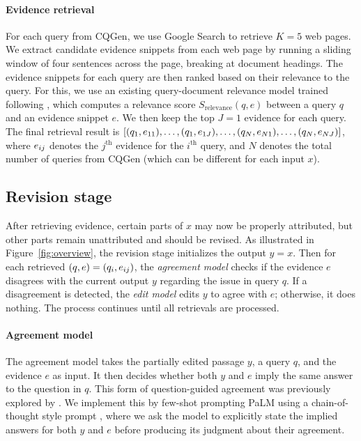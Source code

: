 \documentclass[11pt]{article}
\begin{document}
\paragraph{Evidence retrieval}
For each query from CQGen, we use Google Search to retrieve $K=5$ web pages.
We extract candidate evidence snippets from each web page by running a sliding window of four sentences across the page, breaking at document headings.
The evidence snippets for each query are then ranked based on their relevance to the query. For this, we use an existing query-document relevance model trained following \citet{ni2021gtr}, which computes a relevance score $S_{\text{relevance}}(q, e)$ between a query $q$ and an evidence snippet $e$. We then keep the top $J=1$ evidence for each query. 
The final retrieval result is
$[
(q_1, e_{11}),\allowbreak
\ldots,\allowbreak
(q_1, e_{1J}),\allowbreak
\ldots,\allowbreak
(q_N, e_{N1}),\allowbreak
\dots,\allowbreak
(q_N, e_{NJ})]$,
where $e_{ij}$ denotes the $j^{\text{th}}$ evidence for the $i^{\text{th}}$ query, and $N$ denotes the total number of queries from CQGen (which can be different for each input $x$).


\subsection{Revision stage}\label{sec:approach-editor}

After retrieving evidence, certain parts of $x$ may now be properly attributed, but other parts remain unattributed and should be revised.
As illustrated in Figure~\ref{fig:overview},
the revision stage initializes the output $y = x$. Then for each retrieved $(q, e) = (q_i, e_{ij})$,
the \emph{agreement model} checks if the evidence $e$ disagrees with the current output $y$ regarding the issue in query $q$. If a disagreement is detected, the \emph{edit model} edits $y$ to agree with $e$; otherwise, it does nothing. The process continues until all retrievals are processed.

\paragraph{Agreement model}
The agreement model takes the partially edited passage $y$, a query $q$, and the evidence $e$ as input. It then decides whether both $y$ and $e$ imply the same answer to the question in $q$. This form of question-guided agreement was previously explored by \citet{honovich2021q2}.
We implement this by few-shot prompting PaLM using a chain-of-thought style prompt \cite{Wei2022COT}, where we ask the model to explicitly state the implied answers for both $y$ and $e$ before producing its judgment about their agreement. %
\end{document}
